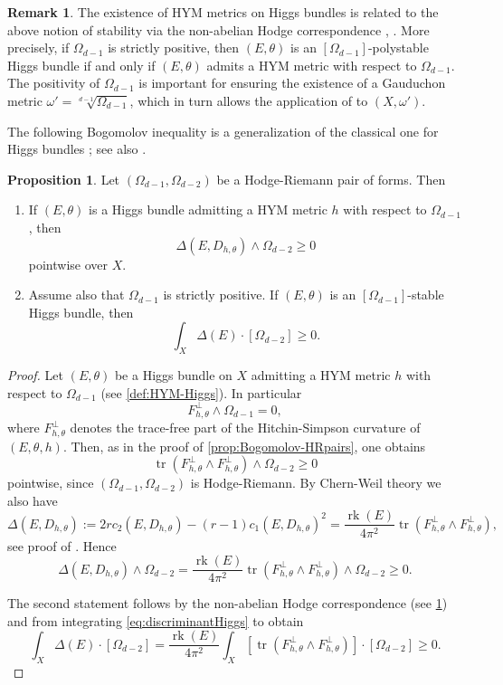 \documentclass[a4,reqno]{amsart}
\theoremstyle{definition}
\newtheorem{proposition}[theorem]{Proposition}
\newtheorem{remark}[theorem]{Remark}
\DeclareMathOperator{\rk}{rk}
\DeclareMathOperator{\tr}{tr}
\numberwithin{equation}{section}
\begin{document}
\begin{remark}\label{rmk:non-abelianHodge}
The existence of HYM metrics on Higgs bundles is related to the above notion of stability via the non-abelian Hodge correspondence \cite{Simpson-HiggsBundles}, \cite{Nie-Zhang-HiggsGauduchon}. More precisely, if $\Omega_{d-1}$ is strictly positive, then $(E,\theta)$ is an $[\Omega_{d-1}]$-polystable Higgs bundle if and only if $(E,\theta)$ admits a HYM metric with respect to $\Omega_{d-1}$. The positivity of $\Omega_{d-1}$ is important for ensuring the existence of a Gauduchon metric $\omega' = \sqrt[d-1]{\Omega_{d-1}}$, which in turn allows the application of \cite[Theorem 1.1]{Nie-Zhang-HiggsGauduchon} to $(X,\omega')$.
\end{remark}

The following Bogomolov inequality is a generalization of the classical one for Higgs bundles \cite[Proposition 3.4]{Simpson-HiggsBundles}; see also \cite[Corollary 3.4]{Chen-Wentworth-nonabelianHodge}.
\begin{proposition}\label{prop:BG-Higgs} 
Let $(\Omega_{d-1},\Omega_{d-2})$ be a Hodge-Riemann pair of forms. Then
\begin{enumerate}
    \item If $(E,\theta)$ is a Higgs bundle admitting a HYM metric $h$ with respect to $\Omega_{d-1}$, then
\[
    \Delta(E,D_{h,\theta}) \wedge \Omega_{d-2} \ge 0
\]
pointwise over $X$.
    \item Assume also that $\Omega_{d-1}$ is strictly positive. If $(E,\theta)$ is an $[\Omega_{d-1}]$-stable Higgs bundle, then
\[
    \int_X \Delta(E) \cdot [\Omega_{d-2}] \ge 0.
\]
\end{enumerate}
\end{proposition}
\begin{proof}
Let $(E,\theta)$ be a Higgs bundle on $X$ admitting a HYM metric $h$ with respect to $\Omega_{d-1}$ (see \cref{def:HYM-Higgs}). In particular
\[
    F_{h,\theta}^\perp \wedge \Omega_{d-1} = 0,
\]
where $F_{h,\theta}^\perp$ denotes the trace-free part of the Hitchin-Simpson curvature of $(E,\theta,h)$. Then, as in the proof of \cref{prop:Bogomolov-HRpairs}, one obtains
\[
    \tr(F_{h,\theta}^\perp \wedge F_{h,\theta}^\perp)\wedge \Omega_{d-2} \ge 0
\]
pointwise, since $(\Omega_{d-1},\Omega_{d-2})$ is Hodge-Riemann. By Chern-Weil theory we also have
\[
    \Delta(E,D_{h,\theta}) := 2r c_2(E,D_{h,\theta})  - (r-1) c_1(E,D_{h,\theta})^2 = \frac{\rk(E)}{4\pi^2} \tr(F_{h,\theta}^\perp \wedge F_{h,\theta}^\perp),
\]
see proof of \cite[Theorem 2.2.3]{LuTe}. Hence
\begin{equation}\label{eq:discriminantHiggs}
    \Delta(E,D_{h,\theta}) \wedge \Omega_{d-2} = \frac{\rk(E)}{4\pi^2} \tr(F_{h,\theta}^\perp \wedge F_{h,\theta}^\perp)\wedge \Omega_{d-2} \ge 0.
\end{equation}

The second statement follows by the non-abelian Hodge correspondence (see \cref{rmk:non-abelianHodge}) and from integrating \eqref{eq:discriminantHiggs} to obtain
\[
    \int_X \Delta(E) \cdot [\Omega_{d-2}] = \frac{\rk(E)}{4\pi^2} \int_X [\tr(F_{h,\theta}^\perp \wedge F_{h,\theta}^\perp)] \cdot [\Omega_{d-2}] \ge 0.
\]
\end{proof}
\end{document}
